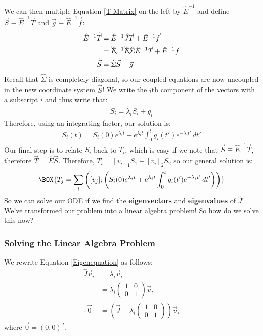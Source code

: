 We can then multiple Equation \ref{T Matrix} on the left by $\hat{E}^{-1}$ and define $\vec{S}\equiv\hat{E}^{-1}\vec{T}$ and $\vec{g}\equiv\hat{E}^{-1}\vec{f}$:
\begin{align*}
    \hat{E}^{-1}\dot{\vec{T}}
    &=
    \hat{E}^{-1}\hat{J}\vec{T}+\hat{E}^{-1}\vec{f}\\
    &=\bcancel{\hat{E}}^{-1}\bcancel{\hat{E}}\hat{\Sigma}\hat{E}^{-1}\vec{T}+\hat{E}^{-1}\vec{f}\\
    \dot{\vec{S}}&=\hat{\Sigma}\vec{S}+\vec{g}
\end{align*}
Recall that $\hat{\Sigma}$ is completely diagonal, so our coupled equations are now uncoupled in the new coordinate system $\vec{S}$! We write the $i$th component of the vectors with a subscript $i$ and thus write that:
\begin{align*}
    \dot{S}_i=\lambda_i S_i + g_i
\end{align*}
Therefore, using an integrating factor, our solution is:
\begin{align*}
    \label{Dym System Gen Sol}
    S_i(t)=S_i(0)e^{\lambda_i t}+e^{\lambda_i t}\int_{0}^{t}g_i(t')e^{-\lambda_i t'}\,dt'
\end{align*}
Our final step is to relate $S_i$ back to $T_i$, which is easy if we note that $\vec{S}\equiv\hat{E}^{-1}\vec{T}$, therefore $\vec{T}=\hat{E}\vec{S}$. Therefore, $T_i=[v_i]_1S_1+[v_i]_2S_2$ so our general solution is:
\begin{align}
    \BOX{
        T_j=\sum_{i} \left( [v_j]_i \left( S_i(0)e^{\lambda_i t}+e^{\lambda_i t}\int_{0}^{t}g_i(t')e^{-\lambda_i t'}\,dt' \right) \right)
    }
\end{align}
So we can solve our ODE if we find the \textbf{eigenvectors} and \textbf{eigenvalues} of $\hat{J}$! We've transformed our problem into a linear algebra problem! So how do we solve this now?

\subsubsection{Solving the Linear Algebra Problem}

We rewrite Equation \ref{Eigenequation} as follows:
\begin{align*}
    \hat{J}\vec{v}_i&=\lambda_i\vec{v}_i\\
    &=\lambda_i\left( \begin{array}{cc}
        1 & 0 \\
        0 & 1
    \end{array} \right)\vec{v}_i\\
    \therefore \vec{0} & = \left( 
        \vec{J} - \lambda_i \left( \begin{array}{cc}
        1 & 0 \\
        0 & 1
    \end{array} \right)
    \right)\vec{v}_i
\end{align*}
where $\vec{0}=(0,0)^T$. 

